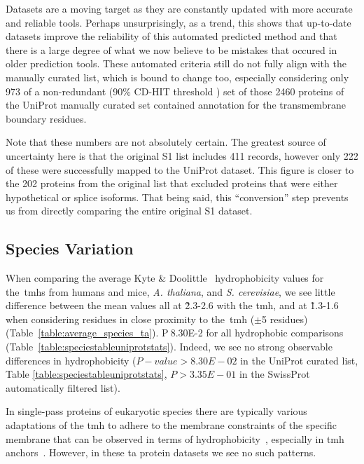 Datasets are a moving target as they are constantly updated with more accurate and reliable tools.
Perhaps unsurprisingly, as a trend, this shows that up-to-date datasets improve the reliability of this automated predicted method and that there is a large degree of what we now believe to be mistakes that occured in older prediction tools.
These automated criteria still do not fully align with the manually curated list, which is bound to change too, especially considering only 973 of a non-redundant (90\% CD-HIT threshold \cite{Huang2010, Wu2011}) set of those 2460 proteins of the UniProt manually curated set contained annotation for the transmembrane boundary residues.

Note that these numbers are not absolutely certain.
The greatest source of uncertainty here is that the original S1 list includes 411 records, however only 222 of these were successfully mapped to the UniProt dataset.
This figure is closer to the 202 proteins from the original list that excluded proteins that were either hypothetical or splice isoforms.
That being said, this ``conversion'' step prevents us from directly comparing the entire original S1 dataset.

\subsection{Species Variation}

When comparing the average Kyte \& Doolittle~\cite{Kyte1982} hydrophobicity values for the~\gls{tmh}s from humans and mice, \textit{A. thaliana}, and  \textit{S. cerevisiae}, we see little difference between the mean values all at \~2.3-2.6 with the \gls{tmh}, and at \~1.3-1.6 when considering residues in close proximity to the~\gls{tmh} ($\pm$5 residues)(Table~\ref{table:average_species_ta}).
P$\>$8.30E-2 for all hydrophobic comparisons (Table~\ref{table:speciestableuniprotstats}).
Indeed, we see no strong observable differences in hydrophobicity ($P-value>8.30E-02$ in the UniProt curated list, Table \ref{table:speciestableuniprotstats}, $P>3.35E-01$ in the SwissProt automatically filtered list).

In single-pass proteins of eukaryotic species there are typically various adaptations of the \gls{tmh} to adhere to the membrane constraints of the specific membrane that can be observed in terms of hydrophobicity~\cite{Sharpe2010}, especially in \gls{tmh} anchors~\cite{Baker2017}.
However, in these \gls{ta} protein datasets we see no such patterns.

